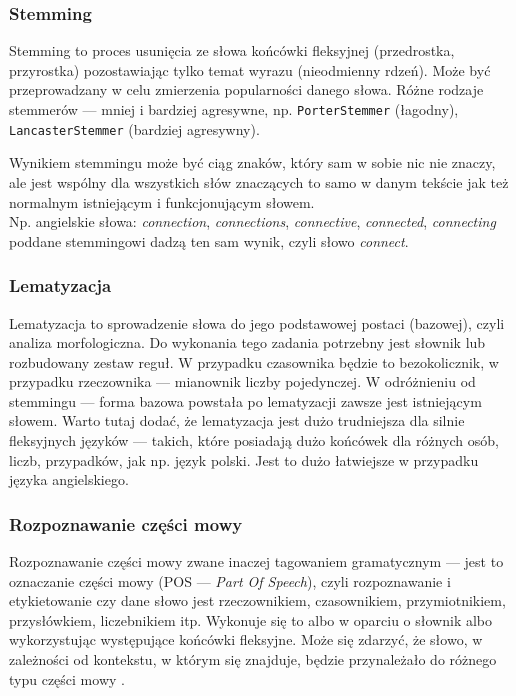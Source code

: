 \subsubsection{Stemming}
Stemming
to proces usunięcia ze słowa końcówki fleksyjnej (przedrostka, przyrostka) pozostawiając tylko temat wyrazu (nieodmienny rdzeń). Może być przeprowadzany w celu zmierzenia popularności danego słowa. Różne rodzaje stemmerów --- mniej i bardziej agresywne, np. \verb|PorterStemmer| (łagodny), \verb|LancasterStemmer| (bardziej agresywny).

\noindent Wynikiem stemmingu może być ciąg znaków, który sam w sobie nic nie znaczy, ale jest wspólny dla wszystkich słów znaczących to samo w danym tekście jak też normalnym istniejącym i  funkcjonującym słowem. \\
Np. angielskie słowa: \textit{connection}, \textit{connections}, \textit{connective}, \textit{connected}, \textit{connecting} poddane stemmingowi dadzą ten sam wynik, czyli słowo \textit{connect}.

\subsubsection{Lematyzacja}
Lematyzacja to sprowadzenie słowa do jego podstawowej postaci (bazowej), czyli analiza morfologiczna. Do wykonania tego zadania potrzebny jest słownik lub rozbudowany zestaw reguł.
W przypadku czasownika będzie to bezokolicznik, w przypadku rzeczownika --- mianownik liczby pojedynczej. W odróżnieniu od stemmingu --- forma bazowa powstała po lematyzacji zawsze jest  istniejącym słowem.
Warto tutaj dodać, że lematyzacja jest dużo trudniejsza dla silnie fleksyjnych języków ---  takich, które posiadają dużo końcówek dla różnych osób, liczb, przypadków, jak np. język polski. Jest to dużo łatwiejsze w przypadku języka angielskiego.


\subsubsection{Rozpoznawanie części mowy}
Rozpoznawanie części mowy zwane inaczej tagowaniem gramatycznym --- jest to oznaczanie części mowy (POS --- \textit{Part Of Speech}), czyli rozpoznawanie i etykietowanie czy dane słowo jest rzeczownikiem, czasownikiem, przymiotnikiem, przysłówkiem, liczebnikiem itp. Wykonuje się to albo w oparciu o słownik albo wykorzystując występujące końcówki fleksyjne. Może się zdarzyć, że słowo, w zależności od kontekstu, w którym się znajduje, będzie przynależało do różnego typu części mowy . 
\\

